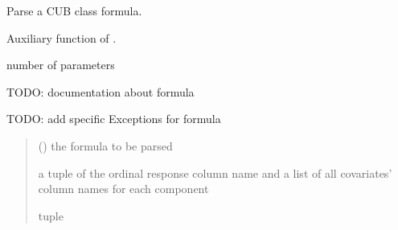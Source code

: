 \documentclass[letterpaper,10pt,english]{sphinxmanual}
\begin{document}

\begin{fulllineitems}
\label{\detokenize{cubmods:cubmods.general.formula_parser}}
\pysigstartsignatures
{}
\pysigstopsignatures
\sphinxAtStartPar
Parse a CUB class formula.

\sphinxAtStartPar
Auxiliary function of .
\begin{description}
\sphinxAtStartPar
number of parameters

\end{description}

\sphinxAtStartPar
TODO: documentation about formula

\sphinxAtStartPar
TODO: add specific Exceptions for formula
\begin{quote}\begin{description}
\sphinxAtStartPar
{} () \textendash{} the formula to be parsed

\sphinxAtStartPar
a tuple of the ordinal response column name and a list of all
covariates’ column names for each component

\sphinxAtStartPar
tuple

\end{description}\end{quote}

\end{fulllineitems}

\end{document}
